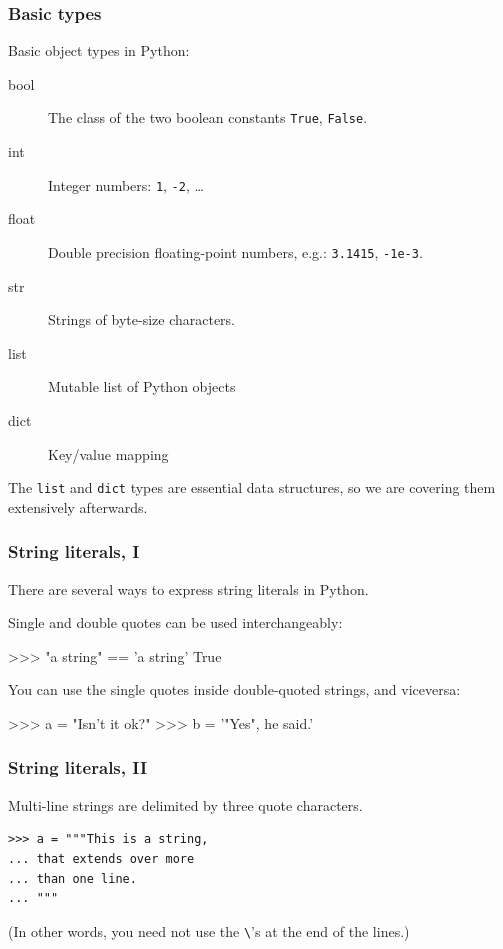 \documentclass[english,serif,mathserif,xcolor=pdftex,dvipsnames,table]{beamer}
\begin{document}
\begin{frame}
  \frametitle{Basic types}
  Basic object types in Python:
  \begin{description}
  \item[bool] The class of the two boolean constants \texttt{True}, \texttt{False}.
  \item[int] Integer numbers: \texttt{1}, \texttt{-2}, \ldots
  \item[float] Double precision floating-point numbers, e.g.:
    \texttt{3.1415}, \texttt{-1e-3}.
  \item[str] Strings of byte-size characters.
  \item[list] Mutable list of Python objects
  \item[dict] Key/value mapping
  \end{description}

  \+
  The \texttt{list} and \texttt{dict} types are essential data
  structures, so we are covering them extensively afterwards.
\end{frame}

\begin{frame}[fragile]
  \frametitle{String literals, I}
  There are several ways to express string literals in Python.

  \+
  Single and double quotes can be used interchangeably:
\begin{semiverbatim}
>>> "a string" == 'a string'
True
\end{semiverbatim}

  \+
  You can use the single quotes inside double-quoted strings, and viceversa:
\begin{semiverbatim}
>>> a = "Isn't it ok?"
>>> b = '"Yes", he said.'
\end{semiverbatim}
\end{frame}


\begin{frame}[fragile]
  \frametitle{String literals, II}
  Multi-line strings are delimited by three quote characters.
\begin{lstlisting}
>>> a = """This is a string,
... that extends over more
... than one line.
... """
\end{lstlisting}

\+
(In other words, you need not use the \texttt{\textbackslash}'s at the end of the lines.)
\end{frame}
\end{document}
